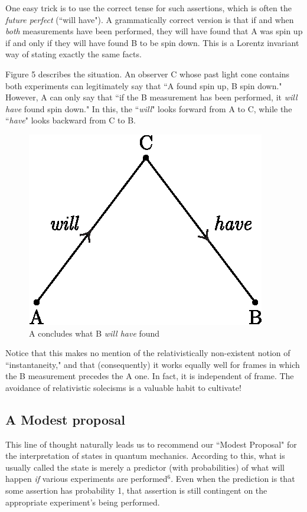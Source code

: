 \documentclass[12pt]{amsart}
\begin{document}
One easy trick is to use the correct tense for such assertions, which is often
the {\em future perfect} (``will have"). 
A grammatically correct version is that 
if and when {\it both} measurements have been performed, 
they will have found that
A was spin up if and only if they will have found B to be spin down. 
This is a Lorentz invariant way of stating exactly the same facts. 

Figure 5 describes the situation.  An observer C whose past light cone contains
both experiments can legitimately say that 
``A found spin up, B spin down."  However,  A can only say 
that ``if the B measurement has been performed, it
{\em will have} found spin down."  
In this, the ``{\em will}" looks forward from 
A to C, while the ``{\em have}" looks backward from C to B.

\begin{figure}[!h]
\centering
\includegraphics{ACB.eps}
\caption{A concludes what B {\em will have} found}
\end{figure}

Notice that this makes no mention of the relativistically 
non-existent notion of ``instantaneity," and that (consequently) 
it works equally well for frames in which
the B measurement precedes the A one.  
In fact, it is independent of frame. 
The avoidance of relativistic solecisms is a valuable habit to cultivate!

\subsection{ A Modest proposal}

This line of thought naturally leads us to recommend our 
``Modest Proposal" for the interpretation of states in quantum mechanics. 
According to this, what is usually called the state is merely
a predictor (with probabilities) of what will happen {\em if} various
experiments are performed$^6$. Even when the prediction 
is that some assertion has probability 1, that assertion is 
still contingent on the appropriate experiment's being performed.
\end{document}
